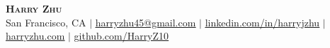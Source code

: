 \pagestyle{fancy}
\fancyhf{} %
\fancyfoot{}
\renewcommand{\headrulewidth}{0pt}
\renewcommand{\footrulewidth}{0pt}

\begin{center}
    \textbf{\Huge\scshape Harry Zhu} \\ \vspace{1pt}
    San Francisco, CA
    $|$ \href{mailto:harryzhu45@gmail.com}{\underline{harryzhu45@gmail.com}}
    $|$ \href{https://linkedin.com/in/harryjzhu}{\underline{linkedin.com/in/harryjzhu}}
    $|$ \href{https://harryzhu.com}{\underline{harryzhu.com}}
    $|$ \href{https://github.com/HarryZ10}{\underline{github.com/HarryZ10}}
\end{center}
